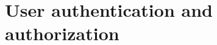 \documentclass[../main.tex]{subfiles}
\begin{document}
\section{User authentication and authorization}
\end{document}
